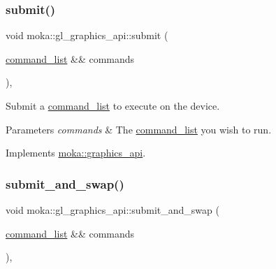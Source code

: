 \mbox{\label{classmoka_1_1gl__graphics__api_abdf61ff67554bb656181942efeac9454}} 
\subsubsection{\texorpdfstring{submit()}{submit()}}
{\footnotesize\ttfamily void moka\+::gl\+\_\+graphics\+\_\+api\+::submit (\begin{DoxyParamCaption}\item[{\mbox{\hyperlink{classmoka_1_1command__list}{command\+\_\+list}} \&\&}]{commands }\end{DoxyParamCaption})\hspace{0.3cm}{\ttfamily [override]}, {\ttfamily [virtual]}}



Submit a \mbox{\hyperlink{classmoka_1_1command__list}{command\+\_\+list}} to execute on the device. 


\begin{DoxyParams}{Parameters}
{\em commands} & The \mbox{\hyperlink{classmoka_1_1command__list}{command\+\_\+list}} you wish to run. \\
\hline
\end{DoxyParams}


Implements \mbox{\hyperlink{classmoka_1_1graphics__api_abd438a03be4a08c1cd043a7cefa17cd9}{moka\+::graphics\+\_\+api}}.

\mbox{\label{classmoka_1_1gl__graphics__api_af9d00204058312ad8cf09e2d24a32151}} 
\subsubsection{\texorpdfstring{submit\_and\_swap()}{submit\_and\_swap()}}
{\footnotesize\ttfamily void moka\+::gl\+\_\+graphics\+\_\+api\+::submit\+\_\+and\+\_\+swap (\begin{DoxyParamCaption}\item[{\mbox{\hyperlink{classmoka_1_1command__list}{command\+\_\+list}} \&\&}]{commands }\end{DoxyParamCaption})\hspace{0.3cm}{\ttfamily [override]}, {\ttfamily [virtual]}}



